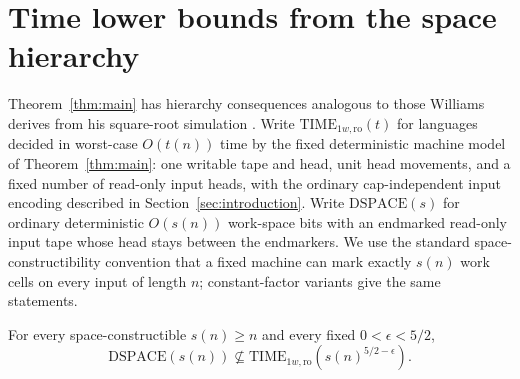 \section{Time lower bounds from the space hierarchy}
\label{sec:hierarchy}

Theorem~\ref{thm:main} has hierarchy consequences analogous to those
Williams derives from his square-root simulation
\cite[Corollaries~1.2--1.3 and Section~4]{Williams2025}.
Write \(\mathrm{TIME}_{1w,\mathrm{ro}}(t)\) for languages decided in
worst-case \(O(t(n))\) time by the fixed deterministic machine model of
Theorem~\ref{thm:main}: one writable tape and head, unit head movements,
and a fixed number of read-only input heads, with the ordinary
cap-independent input encoding described in Section~\ref{sec:introduction}.
Write \(\mathrm{DSPACE}(s)\) for ordinary deterministic \(O(s(n))\)
work-space bits with an endmarked read-only input tape whose head stays
between the endmarkers. We use the standard
space-constructibility convention that a fixed machine can mark exactly
\(s(n)\) work cells on every input of length \(n\); constant-factor
variants give the same statements.

\begin{corollary}
\label{cor:space-hierarchy}
For every space-constructible \(s(n)\ge n\) and every fixed
\(0<\epsilon<5/2\),
\[
 \mathrm{DSPACE}(s(n))\not\subseteq
 \mathrm{TIME}_{1w,\mathrm{ro}}\!\left(s(n)^{5/2-\epsilon}\right).
\]
\end{corollary}

